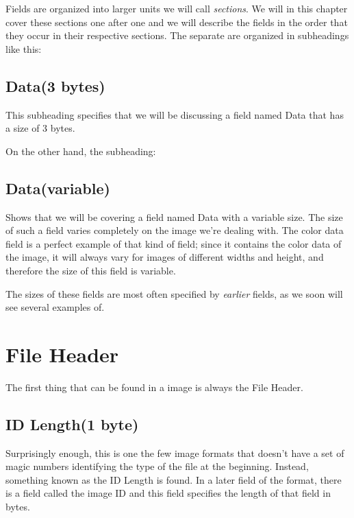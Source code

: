 \newcommand{\plural}[3]{\ifstrequal{#1}{1}{#2}{#3}}
\newcommand{\fieldlength}[1]{\ifstrequal{#1}{0}{variable}{#1 \plural{#1}{byte}{bytes}}}
\newcommand{\imgfield}[2]{\subsection*{#1(\fieldlength{#2})}}
\newcommand{\imgsubfield}[2]{\subsubsection*{#1(\fieldlength{#2})}}

Fields are organized into larger units we will call
\textit{sections}. We will in this chapter cover these
sections one after one and we will describe the fields in the order
that they occur in their respective sections. The separate are
organized in subheadings like this:

\imgfield{Data}{3}

This subheading specifies that we will be discussing a field named
Data that has a size of 3 bytes.

On the other hand, the subheading:

\imgfield{Data}{0}

Shows that we will be covering a field named Data with a variable
size. The size of such a field varies completely on the image we're
dealing with. The color data field is a perfect example of that kind
of field; since it contains the color data of the image, it will
always vary for images of different widths and height, and therefore
the size of this field is variable.

The sizes of these fields are most often specified by \textit{earlier}
fields, as we soon will see several examples of.

\section{File Header}

The first thing that can be found in a \tga image is always the File
Header.

\imgfield{ID Length}{1}

Surprisingly enough, this is one the few image formats that doesn't
have a set of magic numbers identifying the type of the file at the
beginning. Instead, something known as the ID Length is found. In a
later field of the format, there is a field called the image ID and
this field specifies the length of that field in bytes.

